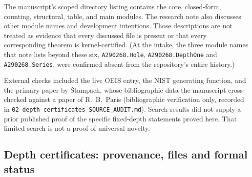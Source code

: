 \documentclass[11pt,a4paper]{article}
\numberwithin{equation}{section}
\theoremstyle{definition}
\theoremstyle{remark}
\theoremstyle{plain}
\begin{document}
The manuscript's scoped directory listing contains the core, closed-form,
counting, structural, table, and main modules.  The research note also
discusses other module names and development intentions.  Those descriptions
are not treated as evidence that every discussed file is present or that every
corresponding theorem is kernel-certified.  (At the intake, the three module
names that note lists beyond these six, \texttt{A290268.Hole},
\texttt{A290268.DepthOne} and \texttt{A290268.Series}, were confirmed absent
from the repository's entire history.)

External checks included the live OEIS entry, the NIST generating
function, and the primary paper by \v{S}tampach, whose bibliographic data the
manuscript cross-checked against a paper of R.~B.~Paris (bibliographic
verification only, recorded in \texttt{02-depth-\allowbreak certificates-\allowbreak SOURCE\_AUDIT.md}).
Search results did not supply a prior published proof of the specific
fixed-depth statements proved here.  That limited search is not a proof of
universal novelty.

\subsection{Depth certificates: provenance, files and formal status}\label{xxb:dc:sec:provenance}
\end{document}
